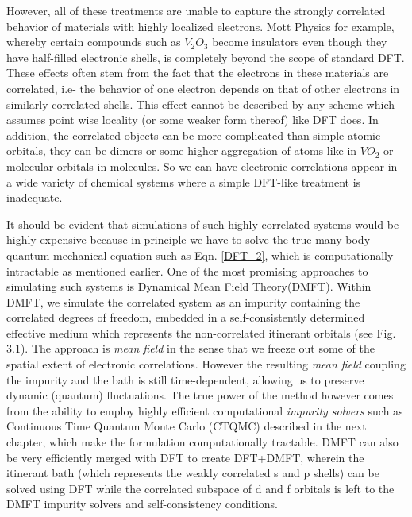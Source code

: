 \documentclass[10pt]{ruthesis}
\begin{document}
However, all of these treatments are unable to capture the strongly correlated behavior of materials with highly localized electrons. Mott Physics for example, whereby certain compounds such as $V_2O_3$ become insulators even though they have half-filled electronic shells, is completely beyond the scope of standard DFT. These effects often stem from the fact that the electrons in these materials are correlated, i.e- the behavior of one electron depends on that of other electrons in similarly correlated shells. This effect cannot be described by any scheme which assumes point wise locality (or some weaker form thereof) like DFT does. In addition, the correlated objects can be more complicated than simple atomic orbitals, they can be dimers or some higher aggregation of atoms like in $VO_2$ or molecular orbitals in molecules. So we can have electronic correlations appear in a wide variety of chemical systems where a simple DFT-like treatment is inadequate.

It should be evident that simulations of such highly correlated systems would be highly expensive because in principle we have to solve the true many body quantum mechanical equation such as Eqn. \ref{DFT_2}, which is computationally intractable as mentioned earlier. One of the most promising approaches to simulating such systems is Dynamical Mean Field Theory(DMFT). Within DMFT, we simulate the correlated system as an impurity containing the correlated degrees of freedom, embedded in a self-consistently determined effective medium which represents the non-correlated itinerant orbitals (see Fig. 3.1). The approach is \textit{mean field} in the sense that we freeze out some of the spatial extent of electronic correlations. However the resulting \textit{mean field} coupling the impurity and the bath is still time-dependent, allowing us to preserve dynamic (quantum) fluctuations. The true power of the method however comes from the ability to employ highly efficient computational \textit{impurity solvers} such as Continuous Time Quantum Monte Carlo (CTQMC) described in the next chapter, which make the formulation computationally tractable. DMFT can also be very efficiently merged with DFT to create DFT+DMFT, wherein the itinerant bath (which represents the weakly correlated s and p shells) can be solved using DFT while the correlated subspace of d and f orbitals is left to the DMFT impurity solvers and self-consistency conditions.
\end{document}
